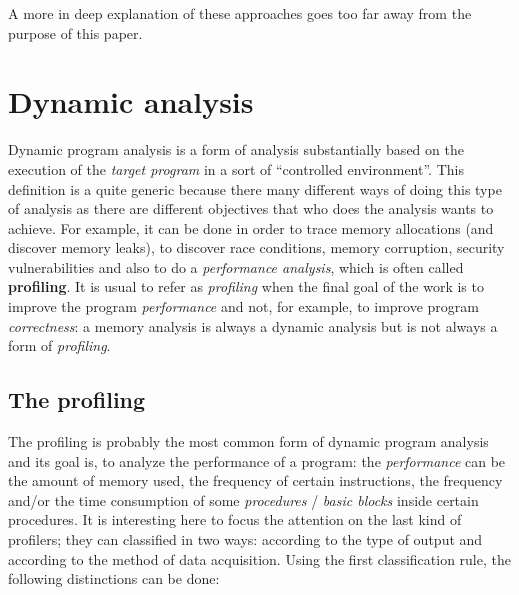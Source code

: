 \documentclass[a4paper,10pt]{report}
\begin{document}
A more in deep explanation of these approaches goes too far away from the purpose of this paper.

\section{Dynamic analysis}

Dynamic program analysis is a form of analysis substantially based on the execution of the \emph{target program} in a sort of ``controlled environment''.
This definition is a quite generic because there many different ways of doing
this type of analysis as there are different objectives that who does the
analysis wants to achieve. For example, it can be done in order to trace memory
allocations (and discover memory leaks), to discover race conditions, memory
corruption, security vulnerabilities and also to do a \emph{performance
analysis}, which is often called \textbf{profiling}. It is usual to refer as \emph{profiling} when
the final goal of the work is to improve the program  \emph{performance} and
not, for example, to improve program \emph{correctness}: a memory analysis
is always a dynamic analysis but is not always a form of \emph{profiling}.

\subsection{The profiling}
The profiling is probably the most common form of dynamic program analysis and
its goal is, to analyze the performance of a program: the
\emph{performance} can be the amount of memory used, the frequency of certain
instructions, the frequency and/or the time consumption of some
\emph{procedures} / \emph{basic blocks} inside certain procedures. 
It is interesting here to focus the attention on the last kind of profilers; 
they can classified in two ways: according to the type of output and according to the method of data acquisition. Using the first classification rule, the following distinctions can be done:
\end{document}

